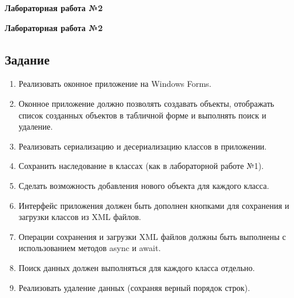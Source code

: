 \documentclass[12pt]{article}
\newcommand{\lablogo}
{
\begin{center}
    \huge{\textbf{Лабораторная работа №2}} \\
\end{center}
}
\renewcommand{\texttt}[1]{{\small\ttfamily #1}}
\numberwithin{listing}{section}
\numberwithin{figure}{section}
\begin{document}
\pagestyle{empty}
\lablogo
\tableofcontents
\newpage
\listoflistings

\newpage
\pagestyle{fancy}
\lablogo
\begin{center}
	\section
	 [Задание \ \texorpdfstring{\faScroll}{}]
	 {Задание \ \texorpdfstring{\faScroll}{}\protect\footnotemark}
\end{center}
\begin{enumerate}
	\item Реализовать оконное приложение на \texttt{Windows Forms}.
	\item Оконное приложение должно позволять создавать объекты, отображать список созданных объектов в табличной форме и выполнять поиск и удаление.
	\item Реализовать сериализацию и десериализацию классов в приложении.
	\item Сохранить наследование в классах (как в лабораторной работе №1).
	\item Сделать возможность добавления нового объекта для каждого класса.
	\item Интерфейс приложения должен быть дополнен кнопками для сохранения и загрузки классов из \texttt{XML} файлов.
	\item Операции сохранения и загрузки \texttt{XML} файлов должны быть выполнены с использованием методов \texttt{async} и \texttt{await}.
	\item Поиск данных должен выполняться для каждого класса отдельно.
	\item Реализовать удаление данных (сохраняя верный порядок строк).
\end{enumerate}

\end{document}
